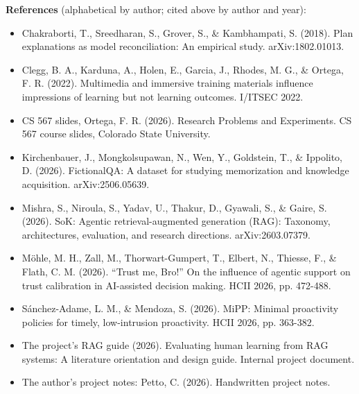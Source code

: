 \documentclass[9pt,conference]{IEEEtran}
\begin{document}
\enlargethispage{\baselineskip}
\footnotesize
\textbf{References} (alphabetical by author; cited above by author and year):
\begin{itemize}
\item Chakraborti, T., Sreedharan, S., Grover, S., \& Kambhampati, S. (2018). Plan explanations as model reconciliation: An empirical study. arXiv:1802.01013.
\item Clegg, B. A., Karduna, A., Holen, E., Garcia, J., Rhodes, M. G., \& Ortega, F. R. (2022). Multimedia and immersive training materials influence impressions of learning but not learning outcomes. I/ITSEC 2022.
\item CS 567 slides, Ortega, F. R. (2026). Research Problems and Experiments. CS 567 course slides, Colorado State University.
\item Kirchenbauer, J., Mongkolsupawan, N., Wen, Y., Goldstein, T., \& Ippolito, D. (2026). FictionalQA: A dataset for studying memorization and knowledge acquisition. arXiv:2506.05639.
\item Mishra, S., Niroula, S., Yadav, U., Thakur, D., Gyawali, S., \& Gaire, S. (2026). SoK: Agentic retrieval-augmented generation (RAG): Taxonomy, architectures, evaluation, and research directions. arXiv:2603.07379.
\item Möhle, M. H., Zall, M., Thorwart-Gumpert, T., Elbert, N., Thiesse, F., \& Flath, C. M. (2026). ``Trust me, Bro!'' On the influence of agentic support on trust calibration in AI-assisted decision making. HCII 2026, pp. 472-488.
\item Sánchez-Adame, L. M., \& Mendoza, S. (2026). MiPP: Minimal proactivity policies for timely, low-intrusion proactivity. HCII 2026, pp. 363-382.
\item The project's RAG guide (2026). Evaluating human learning from RAG systems: A literature orientation and design guide. Internal project document.
\item The author's project notes: Petto, C. (2026). Handwritten project notes.
\end{itemize}
\end{document}
